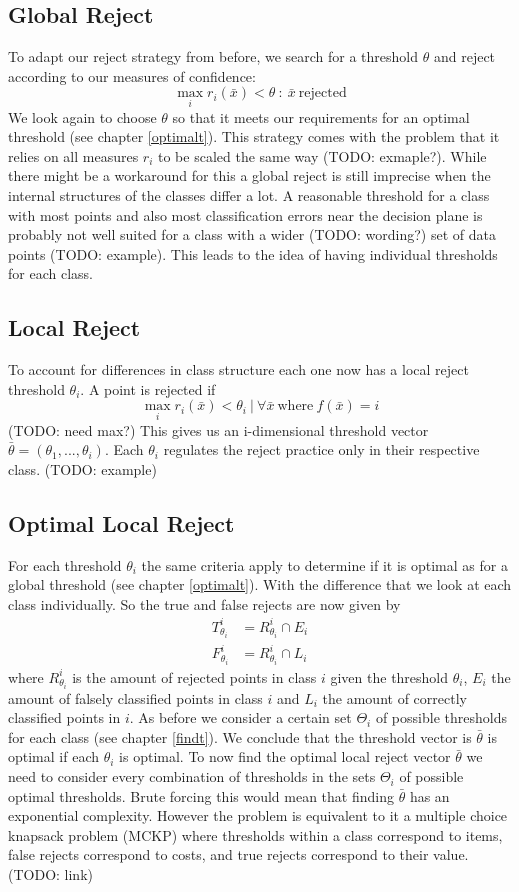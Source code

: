 \subsection{Global Reject}
To adapt our reject strategy from before, we search for a threshold $\theta$ and reject according to our measures of confidence:
$$ \operatorname*{max}_i r_i(\bar{x}) < \theta \ : \ \bar{x} \ \text{rejected}  $$
We look again to choose $\theta$ so that it meets our requirements for an optimal threshold (see chapter \ref{optimalt}). This strategy comes with the problem that it relies on all measures $r_i$ to be scaled the same way (TODO: exmaple?). While there might be a workaround for this a global reject is still imprecise when the internal structures of the classes differ a lot. A reasonable threshold for a class with most points and also most classification errors near the decision plane is probably not well suited for a class with a wider (TODO: wording?) set of data points (TODO: example). This leads to the idea of having individual thresholds for each class.

\subsection{Local Reject}
To account for differences in class structure each one now has a local reject threshold $\theta_i$. A point is rejected if
$$ \operatorname*{max}_i r_i(\bar{x}) < \theta_i \ | \ \forall \bar{x} \  \text{where} \ f(\bar{x}) = i $$ (TODO: need max?)
This gives us an i-dimensional threshold vector $\bar{\theta} = (\theta_1,...,\theta_i)$. Each $\theta_i$ regulates the reject practice only in their respective class. (TODO: example)

\subsection{Optimal Local Reject}
For each threshold $\theta_i$ the same criteria apply to determine if it is optimal as for a global threshold (see chapter \ref{optimalt}). With the difference that we look at each class individually. So the true and false rejects are now given by
\begin{align} 
T_{\theta_i}^i &= R_{\theta_i}^i \cap E_i \\ 
F_{\theta_i}^i &= R_{\theta_i}^i \cap L_i
\end{align}
where $R_{\theta_i}^i$ is the amount of rejected points in class $i$ given the threshold $\theta_i$, $E_i$ the amount of falsely classified points in class $i$ and $L_i$ the amount of correctly classified points in $i$. As before we consider a certain set $\Theta_i$ of possible thresholds for each class (see chapter \ref{findt}). We conclude that the threshold vector is $\bar{\theta}$ is optimal if each $\theta_i$ is optimal. To now find the optimal local reject vector $\bar{\theta}$ we need to consider every combination of thresholds in the sets $\Theta_i$ of possible optimal thresholds. Brute forcing this would mean that finding $\bar{\theta}$ has an exponential complexity. However the problem is equivalent to it a multiple choice knapsack problem (MCKP) where thresholds within a class correspond to items, false rejects correspond to costs, and true rejects correspond to their value. (TODO: link)

